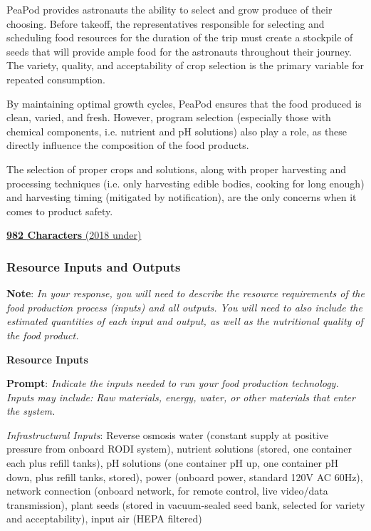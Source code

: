 \documentclass{report}
\begin{document}
PeaPod provides astronauts the ability to select and grow produce of their choosing. Before takeoff, the representatives responsible for selecting and scheduling food resources for the duration of the trip must create a stockpile of seeds that will provide ample food for the astronauts throughout their journey. The variety, quality, and acceptability of crop selection is the primary variable for repeated consumption.

By maintaining optimal growth cycles, PeaPod ensures that the food produced is clean, varied, and fresh. However, program selection (especially those with chemical components, i.e. nutrient and pH solutions) also play a role, as these directly influence the composition of the food products.

The selection of proper crops and solutions, along with proper harvesting and processing techniques (i.e. only harvesting edible bodies, cooking for long enough) and harvesting timing (mitigated by notification), are the only concerns when it comes to product safety.

\uline{\textbf{982 Characters} (2018 under)}


\newpage

\subsubsection{Resource Inputs and Outputs}
\label{sec:resource}

\textbf{Note}: \textit{In your response, you will need to describe the resource requirements of the food production process (inputs) and all outputs. You will need to also include the estimated quantities of each input and output, as well as the nutritional quality of the food product.}

\textbf{Resource Inputs}
\label{sec:resource-inputs}

\textbf{Prompt}: \textit{Indicate the inputs needed to run your food production technology. Inputs may include: Raw materials, energy, water, or other materials that enter the system.}


\textit{Infrastructural Inputs}: Reverse osmosis water (constant supply at positive pressure from onboard RODI system), nutrient solutions (stored, one container each plus refill tanks), pH solutions (one container pH up, one container pH down, plus refill tanks, stored), power (onboard power, standard 120V AC 60Hz), network connection (onboard network, for remote control, live video/data transmission), plant seeds (stored in vacuum-sealed seed bank, selected for variety and acceptability), input air (HEPA filtered)
\end{document}
